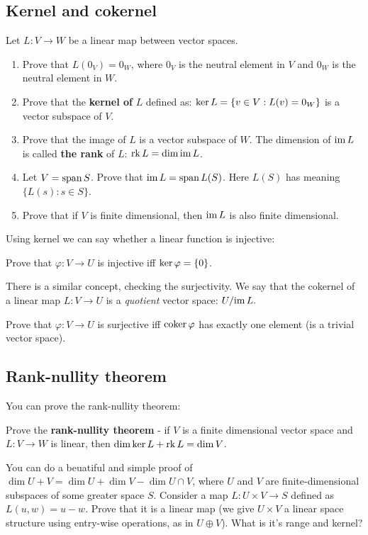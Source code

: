 \subsection{Kernel and cokernel}
\begin{prob}
  Let $L:V\to W$ be a linear map between vector spaces.
  \begin{enumerate}
    \item Prove that $L(0_V)=0_W$, where $0_V$ is the neutral element in $V$ and $0_W$ is the neutral element in $W$.
    \item Prove that the \textbf{kernel of} $L$ defined as: $\text{ker\,} L = \{v\in V : L(v) = 0_W\}$ is a vector subspace of $V$.
    \item Prove that the image of $L$ is a vector subspace of $W$. The dimension of $\text{im\,} L$ is called \textbf{the rank} of $L$: $\text{rk\,} L = \dim \text{im\,} L$.
    \item Let $V=\text{span\,} S$. Prove that $\text{im\,} L=\text{span\,} L(S)$. Here $L(S)$ has meaning $\{L(s) : s\in S\}$.
    \item Prove that if $V$ is finite dimensional, then $\text{im\,} L$ is also finite dimensional.
  \end{enumerate}
\end{prob}

Using kernel we can say whether a linear function is injective:
\begin{prob}
  Prove that $\varphi : V\to U$ is injective iff $\text{ker\,} \varphi = \{0\}$.
\end{prob}

There is a similar concept, checking the surjectivity. We say that the cokernel of a linear map $L: V\to U$ is a \textit{quotient} vector space: $U/\text{im\,} L.$

\begin{prob}
  Prove that $\varphi : V\to U$ is surjective iff $\text{coker\,} \varphi$ has exactly one element (is a trivial vector space).
\end{prob}

\subsection{Rank-nullity theorem}
You can prove the rank-nullity theorem:
\begin{prob}
  Prove the \textbf{rank-nullity theorem} - if $V$ is a finite dimensional vector space and $L:V\to W$ is linear, then $\dim \text{ker\,} L + \text{rk\,} L=\dim V$.
\end{prob}

\begin{prob}
  You can do a beuatiful and simple proof of $\dim U+V = \dim U + \dim V - \dim U\cap V$, where $U$ and $V$ are finite-dimensional subspaces of some greater space $S$.
  Consider a map $L: U\times V\to S$ defined as $L(u,w)=u-w$. Prove that it is a linear map (we give $U\times V$ a linear space structure using entry-wise operations, as in
  $U\oplus V$). What is it's range and kernel?
\end{prob}

